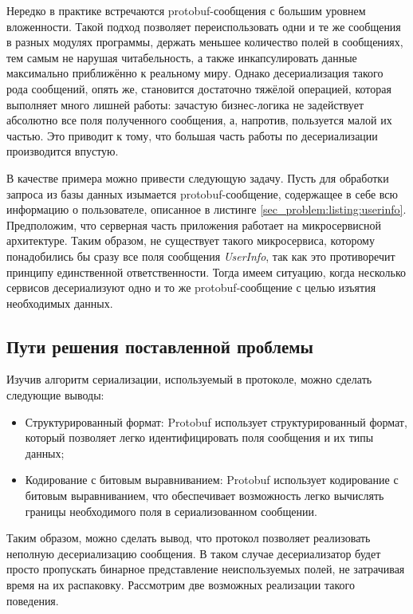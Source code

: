 Нередко в практике встречаются protobuf-сообщения с большим уровнем вложенности. Такой подход позволяет переиспользовать одни и те же сообщения в разных модулях
программы, держать меньшее количество полей в сообщениях, тем самым не нарушая читабельность, а также инкапсулировать данные максимально приближённо к реальному миру.
Однако десериализация такого рода сообщений, опять же, становится достаточно тяжёлой операцией, которая выполняет много лишней работы: зачастую бизнес-логика не задействует
абсолютно все поля полученного сообщения, а, напротив, пользуется малой их частью. Это приводит к тому, что большая часть работы по десериализации производится впустую.

В качестве примера можно привести следующую задачу. Пусть для обработки запроса из базы данных
изымается protobuf-сообщение, содержащее в себе всю информацию о пользователе, описанное в листинге \ref{sec_problem:listing:userinfo}.
Предположим, что серверная часть приложения работает на микросервисной архитектуре. Таким образом, не существует такого микросервиса,
которому понадобились бы сразу все поля сообщения \textit{UserInfo}, так как это противоречит принципу единственной ответственности.
Тогда имеем ситуацию, когда несколько сервисов десериализуют одно и то же protobuf-сообщение с целью изъятия необходимых данных.

\subsection{Пути решения поставленной проблемы}

Изучив алгоритм сериализации, используемый в протоколе, можно сделать следующие выводы:
\begin{itemize}
    \item Структурированный формат: Protobuf использует структурированный формат, который позволяет легко идентифицировать поля сообщения и их типы данных;
    \item Кодирование с битовым выравниванием: Protobuf использует кодирование с битовым выравниванием, что обеспечивает возможность легко вычислять границы необходимого поля в сериализованном сообщении.
\end{itemize}

Таким образом, можно сделать вывод, что протокол позволяет реализовать неполную десериализацию сообщения.
В таком случае десериализатор будет просто пропускать бинарное представление неиспользуемых полей, не затрачивая время на их распаковку.
Рассмотрим две возможных реализации такого поведения.

